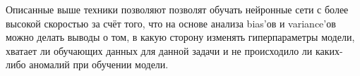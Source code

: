 Описанные выше техники позволяют позволят обучать нейронные сети с более высокой скоростью за счёт того, что на основе анализа bias'ов и variance'ов можно делать выводы о том, в какую сторону изменять гиперпараметры модели, хватает ли обучающих данных для данной задачи и не происходило ли каких-либо аномалий при обучении модели.










